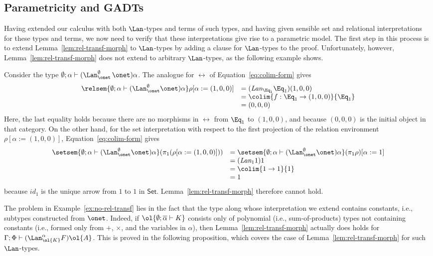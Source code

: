 \documentclass{lmcs}
\theoremstyle{plain}\newtheorem{satz}[thm]{Satz}
\newcommand{\set}{\mathsf{Set}}
\renewcommand{\id}{\mathit{id}}
\begin{document}
\subsection{Parametricity and GADTs}

Having extended our calculus with both $\Lan$-types and terms of such
types, and having given sensible set and relational interpretations
for these types and terms, we now need to verify that these
interpretations give rise to a parametric model. The first step in
this process is to extend Lemma~\ref{lem:rel-transf-morph} to
$\Lan$-types by adding a clause for $\Lan$-types to the proof.
Unfortunately, however, Lemma~\ref{lem:rel-transf-morph} does not
extend to arbitrary $\Lan$-types, as the following example shows.

\begin{exa}\label{ex:no-rel-transf}
Consider the type $\emptyset; \alpha \vdash
(\Lan^{\emptyset}_{\onet}\, \onet) \alpha$. The analogue for $\rel$ of
Equation~\ref{eq:colim-form} gives
\[
\begin{array}{rl}
\relsem{ \emptyset; \alpha \vdash (\Lan^{\emptyset}_{\onet} \onet)
  \alpha } \rho [\alpha := (1, 0, 0)] 
&= (\textit{Lan}_{\Eq_1} \Eq_1)(1, 0, 0) \\
&= \colim{f : \Eq_1 \to (1, 0, 0)}{\Eq_1} \\
&= (0, 0, 0)
\end{array}
\]
Here, the last equality holds because there are no morphisms in $\rel$
from $\Eq_1$ to $(1, 0, 0)$, and because $(0,0,0)$ is the initial
object in that category. On the other hand, for the set interpretation
with respect to the first projection of the relation environment
$\rho[\alpha := (1,0,0)]$, Equation~\ref{eq:colim-form} gives
\[
\begin{array}{rl}
\setsem{ \emptyset; \alpha \vdash (\Lan^{\emptyset}_{\onet} \onet)
  \alpha } ( \pi_1 ( \rho [\alpha := (1, 0, 0)] ) ) 
&= \setsem{ \emptyset; \alpha \vdash (\Lan^{\emptyset}_{\onet} \onet)
  \alpha } (\pi_1 \rho) [\alpha := 1] \\ 
&= (\textit{Lan}_{1} 1) 1 \\
&= \colim{1 \to 1}{1} \\
&= 1
\end{array}
\]
because $\id_1$ is the unique arrow from $1$ to $1$ in $\set$.
Lemma~\ref{lem:rel-transf-morph} therefore cannot hold.
\end{exa}

The problem in Example~\ref{ex:no-rel-transf} lies in the fact that
the type along whose interpretation we extend contains constants, i.e.,
subtypes constructed from $\onet$. Indeed, if $\ol{\emptyset;
  \overline{\alpha} \vdash K}$ consists only of polynomial (i.e.,
sum-of-products) types not containing constants (i.e., formed only
from $+$, $\times$, and the variables in $\alpha$), then
Lemma~\ref{lem:rel-transf-morph} actually does holds for $\Gamma; \Phi
\vdash (\Lan^{\alpha}_{\ol{K}} F)\ol{A}$. This is proved in the
following proposition, which covers the case of
Lemma~\ref{lem:rel-transf-morph} for such $\Lan$-types.
\end{document}
